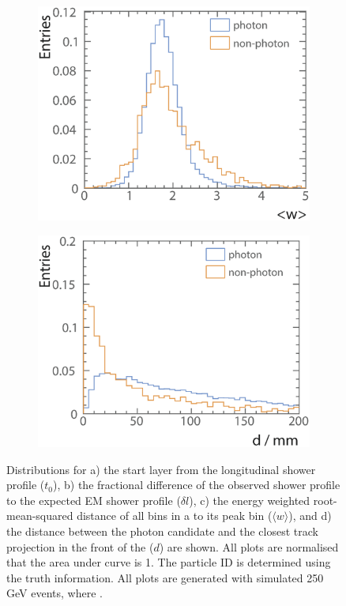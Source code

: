 \begin{figure}[tbph]
\begin{subfigure}[b]{0.45\textwidth}
    \includegraphics[width=\textwidth]{photon/likelihood/PeakRms2}
    \caption{}
    \label{fig:photonPeakRms}
  \end{subfigure}
  \begin{subfigure}[b]{0.45\textwidth}
    \includegraphics[width=\textwidth]{photon/likelihood/MinDistanceToTrack2}
    \caption{}
    \label{fig:photonMinDistanceToTrack}
  \end{subfigure}
\caption
{Distributions for a) the start layer from the longitudinal shower profile ($t_0$), b)  the fractional difference of the observed shower profile to the expected EM shower profile ($\delta{l}$), c) the energy weighted root-mean-squared distance of all bins in a \ShowerPeak to its peak bin ($\langle{w}\rangle$), and d) the distance between the photon candidate and the closest track projection in the front of the \ECAL ($d$) are shown. All plots are normalised that the area under curve is 1. The particle ID is determined using the truth information. All plots are generated with  simulated 250\,GeV \Zprime events, where  \Zuds.}
\label{fig:photonVarLikelihood}
\end{figure}



